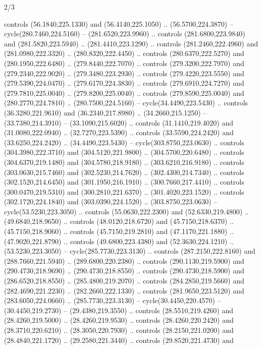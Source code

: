 \begin{flagdescription}{2/3}
\begin{scope}[xshift=0.5\flaglength,yshift=0.5\flagwidth,scale=\stretchfactor]
\begin{scope}[scale=0.001645\flagwidth,yshift=65mm,xshift=-63mm]
\begin{scope}[y=0.80pt, x=0.80pt, yscale=-1,]
\begin{scope}[cm={{1.33333,0.0,0.0,1.33333,(0.0,1e-05)}}]
  controls (56.1840,225.1330) and (56.4140,225.1050) .. (56.5700,224.3870) --
  cycle(280.7460,224.5160) -- (281.6520,223.9960) .. controls
  (281.6800,223.9840) and (281.5820,223.5940) .. (281.4410,223.1290) .. controls
  (281.2460,222.4960) and (281.0980,222.3320) .. (280.8320,222.4450) .. controls
  (280.6370,222.5270) and (280.1950,222.6480) .. (279.8440,222.7070) .. controls
  (279.3200,222.7970) and (279.2340,222.9020) .. (279.3480,223.2930) .. controls
  (279.4220,223.5550) and (279.5390,224.0470) .. (279.6170,224.3830) .. controls
  (279.6910,224.7270) and (279.7810,225.0040) .. (279.8200,225.0040) .. controls
  (279.8590,225.0040) and (280.2770,224.7810) .. (280.7500,224.5160) --
  cycle(34.4490,223.5430) .. controls (36.3280,221.9610) and (36.2340,217.8980)
  .. (34.2660,215.1250) -- (33.7380,214.3910) -- (33.1090,215.6020) .. controls
  (31.1410,219.4020) and (31.0080,222.0940) .. (32.7270,223.5390) .. controls
  (33.5590,224.2420) and (33.6250,224.2420) .. (34.4490,223.5430) --
  cycle(303.8750,223.0630) .. controls (304.3980,222.3710) and
  (304.5120,221.9800) .. (304.5700,220.6480) .. controls (304.6370,219.1480) and
  (304.5780,218.9180) .. (303.6210,216.9180) .. controls (303.0630,215.7460) and
  (302.5230,214.7620) .. (302.4300,214.7340) .. controls (302.1520,214.6450) and
  (301.1950,216.1910) .. (300.7660,217.4410) .. controls (300.0470,219.5310) and
  (300.2810,221.6370) .. (301.4020,223.1520) .. controls (302.1720,224.1840) and
  (303.0390,224.1520) .. (303.8750,223.0630) -- cycle(53.5230,223.3050) ..
  controls (55.0630,222.2300) and (52.6330,219.4800) .. (49.6840,218.9650) ..
  controls (48.0120,218.6720) and (45.7150,218.6370) .. (45.7150,218.9060) ..
  controls (45.7150,219.2810) and (47.1170,221.1880) .. (47.9020,221.8790) ..
  controls (49.6800,223.4380) and (52.3630,224.1210) .. (53.5230,223.3050) --
  cycle(285.7730,223.3130) .. controls (287.2150,222.8160) and
  (288.7660,221.5940) .. (289.6800,220.2380) .. controls (290.1130,219.5900) and
  (290.4730,218.9690) .. (290.4730,218.8550) .. controls (290.4730,218.5900) and
  (286.6520,218.8550) .. (285.4800,219.2070) .. controls (284.2850,219.5660) and
  (282.4690,221.2230) .. (282.2660,222.1330) .. controls (281.9650,223.5120) and
  (283.6050,224.0660) .. (285.7730,223.3130) -- cycle(30.4450,220.4570) --
  (30.4450,219.2730) -- (29.4380,219.3550) .. controls (28.5510,219.4260) and
  (28.4260,219.5000) .. (28.4260,219.9530) .. controls (28.4260,220.2420) and
  (28.3710,220.6210) .. (28.3050,220.7930) .. controls (28.2150,221.0200) and
  (28.4840,221.1720) .. (29.2580,221.3440) .. controls (29.8520,221.4730) and

\end{scope}
\end{scope}
\end{scope}
\end{scope}
\end{flagdescription}
